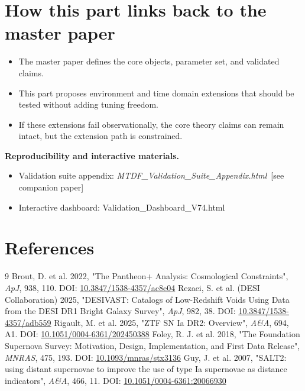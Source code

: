 \documentclass[11pt,a4paper]{article}
\begin{document}
\section{How this part links back to the master paper}
\label{sec:links}
\begin{itemize}
  \item The master paper defines the core objects, parameter set, and validated claims.
  \item This part proposes environment and time domain extensions that should be tested without adding tuning freedom.
  \item If these extensions fail observationally, the core theory claims can remain intact, but the extension path is constrained.
\end{itemize}

\begin{mdframed}[linecolor=accent,linewidth=0.5pt,backgroundcolor=callout-bg,leftline=true,rightline=true,topline=true,bottomline=true,innerleftmargin=8pt,innerrightmargin=8pt,innertopmargin=6pt,innerbottommargin=6pt]
\textbf{Reproducibility and interactive materials.}\begin{itemize}
  \item Validation suite appendix: \textit{MTDF\_\allowbreak{}Validation\_\allowbreak{}Suite\_\allowbreak{}Appendix.html}~[see companion paper]
  \item Interactive dashboard: Validation\_\allowbreak{}Dashboard\_\allowbreak{}V74.html
\end{itemize}
\end{mdframed}

\section{References}
\begin{thebibliography}{9}
 Brout, D. et al. 2022, "The Pantheon+ Analysis: Cosmological Constraints", \emph{ApJ}, 938, 110. DOI: \href{https://doi.org/10.3847/1538-4357/ac8e04}{10.3847/\allowbreak{}1538-4357/\allowbreak{}ac8e04}
 Rezaei, S. et al. (DESI Collaboration) 2025, "DESIVAST: Catalogs of Low-Redshift Voids Using Data from the DESI DR1 Bright Galaxy Survey", \emph{ApJ}, 982, 38. DOI: \href{https://doi.org/10.3847/1538-4357/adb559}{10.3847/\allowbreak{}1538-4357/\allowbreak{}adb559}
 Rigault, M. et al. 2025, "ZTF SN Ia DR2: Overview", \emph{A\&A}, 694, A1. DOI: \href{https://doi.org/10.1051/0004-6361/202450388}{10.1051/\allowbreak{}0004-6361/\allowbreak{}202450388}
 Foley, R. J. et al. 2018, "The Foundation Supernova Survey: Motivation, Design, Implementation, and First Data Release", \emph{MNRAS}, 475, 193. DOI: \href{https://doi.org/10.1093/mnras/stx3136}{10.1093/\allowbreak{}mnras/\allowbreak{}stx3136}
 Guy, J. et al. 2007, "SALT2: using distant supernovae to improve the use of type Ia supernovae as distance indicators", \emph{A\&A}, 466, 11. DOI: \href{https://doi.org/10.1051/0004-6361:20066930}{10.1051/\allowbreak{}0004-6361:20066930}
\end{thebibliography}
\end{document}
